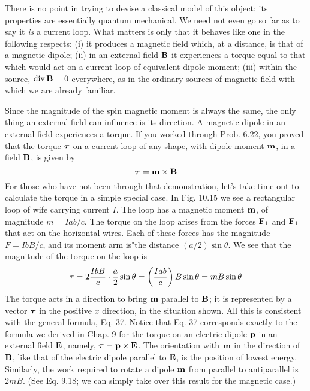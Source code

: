 There is no point in trying to devise a classical model of this object;
its properties are essentially quantum mechanical. We need not
even go so far as to say it \emph{is} a current loop. What matters is only that
it behaves like one in the following respects: (i) it produces a magnetic
field which, at a distance, is that of a magnetic dipole; (ii) in an
external field $\mathbf{B}$ it experiences a torque equal to that which would
act on a current loop of equivalent dipole moment; (iii) within the
source, $\operatorname{div}\mathbf{B} = 0$ everywhere, as in the ordinary sources of magnetic
field with which we are already familiar.

Since the magnitude of the spin magnetic moment is always the
same, the only thing an external field can influence is its direction.
A magnetic dipole in an external field experiences a torque. If you
worked through Prob. 6.22, you proved that the torque $\boldsymbol{\tau}$ on a current
loop of any shape, with dipole moment $\mathbf{m}$, in a field $\mathbf{B}$, is given by
\begin{equation}
  \boldsymbol{\tau} = \mathbf{m}\times\mathbf{B}
\end{equation}
For those who have not been through that demonstration, let's take
time out to calculate the torque in a simple special case. In Fig. 10.15
we see a rectangular loop of wife carrying current $I$. The loop has
a magnetic moment $\mathbf{m}$, of magnitude $m = Iab/c$. The torque on
the loop arises from the forces $\mathbf{F}_1$ and $\mathbf{F}_1$ that act on the horizontal
wires. Each of these forces has the magnitude $F = IbB/c$, and its
moment arm is"the distance $(a/ 2) \sin \theta$. We see that the magnitude
of the torque on the loop is
\begin{equation}
  \tau = 2\frac{IbB}{c} \cdot \frac{a}{2}\sin\theta
    = \left(\frac{Iab}{c}\right)B\sin\theta = mB\sin\theta
\end{equation}
The torque acts in a direction to bring $\mathbf{m}$ parallel to $\mathbf{B}$; it is represented
by a vector $\boldsymbol{\tau}$ in the positive $x$ direction, in the situation
shown. All this is consistent with the general formula, Eq. 37.
Notice that Eq. 37 corresponds exactly to the formula we derived
in Chap. 9 for the torque on an electric dipole $\mathbf{p}$ in an external field $\mathbf{E}$,
namely, $\boldsymbol{\tau} = \mathbf{p} \times \mathbf{E}$. The orientation with $\mathbf{m}$ in the direction of $\mathbf{B}$,
like that of the electric dipole parallel to $\mathbf{E}$, is the position of lowest
energy. Similarly, the work required to rotate a dipole $\mathbf{m}$ from parallel
to antiparallel is $2mB$. (See Eq. 9.18; we can simply take over
this result for the magnetic case.)

